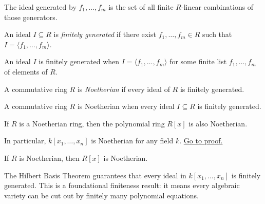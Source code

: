 \begin{remark*}
The ideal generated by $f_1,\dots,f_m$ is the set of all finite
$R$-linear combinations of those generators.
\end{remark*}

\begin{definition}
\label{def:finitely-generated-ideal}
An ideal $I \subseteq R$ is \emph{finitely generated} if there exist
$f_1, \dots, f_m \in R$ such that $I = \langle f_1, \dots, f_m \rangle$.
\end{definition}

\begin{remark*}
An ideal $I$ is finitely generated when $I=\langle f_1,\dots,f_m\rangle$
for some finite list $f_1,\dots,f_m$ of elements of $R$.
\end{remark*}

\begin{definition}
\label{def:noetherian-ring}
A commutative ring $R$ is \emph{Noetherian} if every ideal of $R$
is finitely generated.
\end{definition}

\begin{remark*}
A commutative ring $R$ is Noetherian when every ideal $I\subseteq R$ is
finitely generated.
\end{remark*}

\begin{theorem}
\label{thm:hilbert-basis-theorem}
If $R$ is a Noetherian ring, then the polynomial ring $R[x]$
is also Noetherian.

In particular, $k[x_1, \dots, x_n]$ is Noetherian for any field $k$.
\hyperref[prf:hilbert-basis-theorem]{Go to proof.}
\end{theorem}

\begin{remark*}
If $R$ is Noetherian, then $R[x]$ is Noetherian.
\end{remark*}

\begin{remark*}[Interpretation]
The Hilbert Basis Theorem guarantees that every ideal in
$k[x_1, \dots, x_n]$ is finitely generated.
This is a foundational finiteness result:
it means every algebraic variety can be cut out by
finitely many polynomial equations.
\end{remark*}

